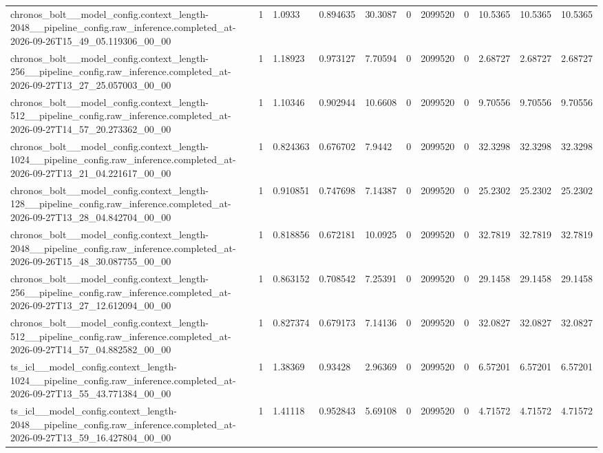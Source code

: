 \begin{tabular}{lllllllllll}
chronos\_bolt\_\_model\_config.context\_length-2048\_\_pipeline\_config.raw\_inference.completed\_at-2026-09-26T15\_49\_05.119306\_00\_00 & 1 & 1.0933 & 0.894635 & 30.3087 & 0 & 2099520 & 0 & 10.5365 & 10.5365 & 10.5365 \\
chronos\_bolt\_\_model\_config.context\_length-256\_\_pipeline\_config.raw\_inference.completed\_at-2026-09-27T13\_27\_25.057003\_00\_00 & 1 & 1.18923 & 0.973127 & 7.70594 & 0 & 2099520 & 0 & 2.68727 & 2.68727 & 2.68727 \\
chronos\_bolt\_\_model\_config.context\_length-512\_\_pipeline\_config.raw\_inference.completed\_at-2026-09-27T14\_57\_20.273362\_00\_00 & 1 & 1.10346 & 0.902944 & 10.6608 & 0 & 2099520 & 0 & 9.70556 & 9.70556 & 9.70556 \\
chronos\_bolt\_\_model\_config.context\_length-1024\_\_pipeline\_config.raw\_inference.completed\_at-2026-09-27T13\_21\_04.221617\_00\_00 & 1 & 0.824363 & 0.676702 & 7.9442 & 0 & 2099520 & 0 & 32.3298 & 32.3298 & 32.3298 \\
chronos\_bolt\_\_model\_config.context\_length-128\_\_pipeline\_config.raw\_inference.completed\_at-2026-09-27T13\_28\_04.842704\_00\_00 & 1 & 0.910851 & 0.747698 & 7.14387 & 0 & 2099520 & 0 & 25.2302 & 25.2302 & 25.2302 \\
chronos\_bolt\_\_model\_config.context\_length-2048\_\_pipeline\_config.raw\_inference.completed\_at-2026-09-26T15\_48\_30.087755\_00\_00 & 1 & 0.818856 & 0.672181 & 10.0925 & 0 & 2099520 & 0 & 32.7819 & 32.7819 & 32.7819 \\
chronos\_bolt\_\_model\_config.context\_length-256\_\_pipeline\_config.raw\_inference.completed\_at-2026-09-27T13\_27\_12.612094\_00\_00 & 1 & 0.863152 & 0.708542 & 7.25391 & 0 & 2099520 & 0 & 29.1458 & 29.1458 & 29.1458 \\
chronos\_bolt\_\_model\_config.context\_length-512\_\_pipeline\_config.raw\_inference.completed\_at-2026-09-27T14\_57\_04.882582\_00\_00 & 1 & 0.827374 & 0.679173 & 7.14136 & 0 & 2099520 & 0 & 32.0827 & 32.0827 & 32.0827 \\
ts\_icl\_\_model\_config.context\_length-1024\_\_pipeline\_config.raw\_inference.completed\_at-2026-09-27T13\_55\_43.771384\_00\_00 & 1 & 1.38369 & 0.93428 & 2.96369 & 0 & 2099520 & 0 & 6.57201 & 6.57201 & 6.57201 \\
ts\_icl\_\_model\_config.context\_length-2048\_\_pipeline\_config.raw\_inference.completed\_at-2026-09-27T13\_59\_16.427804\_00\_00 & 1 & 1.41118 & 0.952843 & 5.69108 & 0 & 2099520 & 0 & 4.71572 & 4.71572 & 4.71572 \\

\end{tabular}
